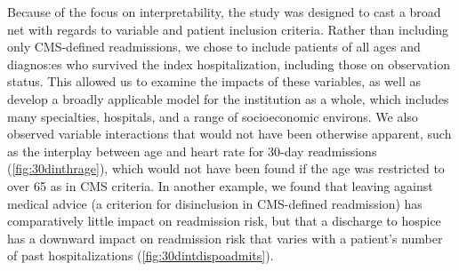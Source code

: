 Because of the focus on interpretability, the study was designed to cast a broad net
with regards to variable and patient inclusion criteria.\@
Rather than including only CMS-defined readmissions, 
we chose to include patients of all ages and diagnos:es who survived the index hospitalization,
including those on observation status.\supercite{obsincreasing2019, obs2016nejm}\@
This allowed us to examine the impacts of these variables, as well as develop a broadly applicable
model for the institution as a whole, which includes many specialties, hospitals, and a range of socioeconomic environs.\@
We also observed variable interactions that would not have been otherwise apparent, 
such as the interplay between age and heart rate for 30-day readmissions (\ref{fig:30dinthrage}),
which would not have been found if the age was restricted to over 65 as in CMS criteria.
In another example, we found that leaving against medical advice (a criterion for disinclusion in CMS-defined readmission)
has comparatively little impact on readmission risk,
but that a discharge to hospice has a downward impact on readmission risk that 
varies with a patient's number of past hospitalizations (\ref{fig:30dintdispoadmits}).\@

